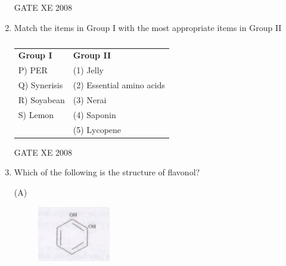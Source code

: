 \documentclass[12pt]{article}
\begin{document}
\begin{enumerate}[label=Q\arabic*.]
\begin{enumerate}[label=(\Alph*)]
\end{enumerate}

GATE XE 2008

\item \noindent Match the items in Group I with the most appropriate items in Group II  

\begin{table}[H]     \centering     \caption{}     \label{}     \begin{tabular}{l l}
\textbf{Group I} & \textbf{Group II} \\
P) PER & (1) Jelly \\
Q) Synerisis & (2) Essential amino acids \\
R) Soyabean & (3) Nerai \\
S) Lemon & (4) Saponin \\
 & (5) Lycopene \\
\end{tabular} \end{table}  

\begin{enumerate}[label=(\Alph*)]
\end{enumerate}

GATE XE 2008

\item Which of the following is the structure of flavonol? 

\begin{multicols}{2}

(A) \begin{figure}[H]
    \includegraphics[width=0.3\textwidth]{figs/ass1_i_q14_1.png}
    \caption{}
    \end{figure}


\end{multicols}
\end{enumerate}
\end{document}
